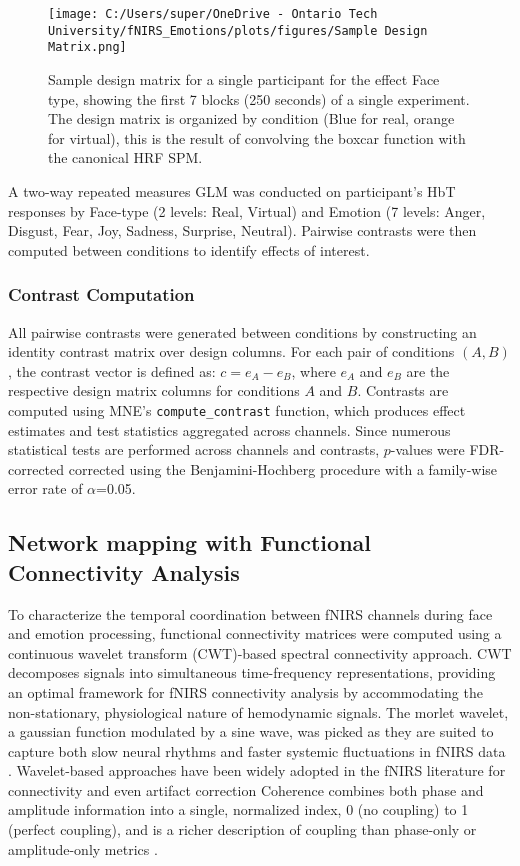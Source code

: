 \begin{figure}[H]
    \centering
    \texttt{[image: C:/Users/super/OneDrive - Ontario Tech University/fNIRS\_Emotions/plots/figures/Sample Design Matrix.png]}
    \caption[Sample design matrix for GLM]{Sample design matrix for a single participant for the effect Face type, showing the first 7 blocks (250 seconds) of a single experiment.
    The design matrix is organized by condition (Blue for real, orange for virtual), this is the result of convolving the boxcar function with the canonical HRF SPM. }
    \label{fig:design_matrix}
\end{figure}

A two-way repeated measures GLM was conducted on participant's HbT responses by Face-type (2 levels: Real, Virtual) and Emotion (7 levels: Anger, Disgust, Fear, Joy, Sadness, Surprise, Neutral). 
Pairwise contrasts were then computed between conditions to identify effects of interest.

\subsubsection{Contrast Computation}
\label{sec:contrast_computation}
All pairwise contrasts were generated between conditions by constructing an identity contrast matrix over design columns. 
For each pair of conditions \( (A, B) \), the contrast vector is defined as: $c = e_A - e_B$, where \( e_A \) and \( e_B \) are the respective design matrix columns for conditions \( A \) and \( B \). 
Contrasts are computed using MNE's \texttt{compute\_contrast} function, which produces effect estimates and test statistics aggregated across channels.
Since numerous statistical tests are performed across channels and contrasts, $p$-values were FDR-corrected corrected using the Benjamini-Hochberg procedure \citep{singh_exploring_2006} with a family-wise error rate of $\alpha$=0.05.

\subsection{Network mapping with Functional Connectivity Analysis}
\label{sec:fc}
To characterize the temporal coordination between fNIRS channels during face and emotion processing, functional connectivity matrices were computed using a continuous wavelet transform (CWT)-based spectral connectivity approach.
CWT decomposes signals into simultaneous time-frequency representations, providing an optimal framework for fNIRS connectivity analysis by accommodating the non-stationary, physiological nature of hemodynamic signals. 
The morlet wavelet, a gaussian function modulated by a sine wave, was picked as they are suited to capture both slow neural rhythms and faster systemic fluctuations in fNIRS data \citep{reddy_evaluation_2021}. 
Wavelet-based approaches have been widely adopted in the fNIRS literature for connectivity and even artifact correction \citep{bergmann_evaluation_2023, hakim_quantification_2023}
Coherence combines both phase and amplitude information into a single, normalized index, 0 (no coupling) to 1 (perfect coupling), and is a richer description of coupling than phase-only or amplitude-only metrics \citep{bastos_tutorial_2016}.

